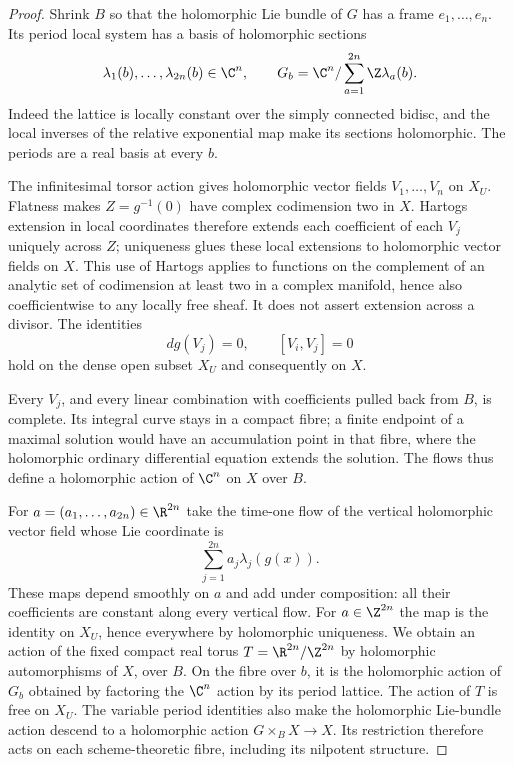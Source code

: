 \begin{proof}
Shrink $B$ so that the holomorphic Lie bundle of $G$ has a
frame $e_1,\ldots,e_n$.  Its period local system has a basis
of holomorphic sections
\[
 \lambda_1(b),\ldots,\lambda_{2n}(b)\in\C^n,
 \qquad
 G_b=\C^n/\sum_{a=1}^{2n}\Z\lambda_a(b).
\]
Indeed the lattice is locally constant over the simply
connected bidisc, and the local inverses of the relative
exponential map make its sections holomorphic.  The periods
are a real basis at every $b$.

The infinitesimal torsor action gives holomorphic vector
fields $V_1,\ldots,V_n$ on $X_U$.  Flatness makes
$Z=g^{-1}(0)$ have complex codimension two in $X$.
Hartogs extension in local coordinates therefore extends
each coefficient of each $V_j$ uniquely across $Z$; uniqueness
glues these local extensions to holomorphic vector fields
on $X$.  This use of Hartogs applies to functions on the
complement of an analytic set of codimension at least two
in a complex manifold, hence also coefficientwise to any
locally free sheaf.  It does not assert extension across a
divisor.  The identities
\[
 dg(V_j)=0,\qquad [V_i,V_j]=0
\]
hold on the dense open subset $X_U$ and consequently on $X$.

Every $V_j$, and every linear combination with coefficients
pulled back from $B$, is complete.  Its integral curve stays
in a compact fibre; a finite endpoint of a maximal solution
would have an accumulation point in that fibre, where the
holomorphic ordinary differential equation extends the
solution.  The flows thus define a holomorphic action of
$\C^n$ on $X$ over $B$.

For $a=(a_1,\ldots,a_{2n})\in\R^{2n}$ take the time-one
flow of the vertical holomorphic vector field whose Lie
coordinate is
\[
 \sum_{j=1}^{2n}a_j\lambda_j(g(x)).
\]
These maps depend smoothly on $a$ and add under composition:
all their coefficients are constant along every vertical
flow.  For $a\in\Z^{2n}$ the map is the identity on $X_U$,
hence everywhere by holomorphic uniqueness.  We obtain an
action of the fixed compact real torus
$T=\R^{2n}/\Z^{2n}$ by holomorphic automorphisms of $X$,
over $B$.  On the fibre over $b$, it is the holomorphic
action of $G_b$ obtained by factoring the $\C^n$ action by
its period lattice.  The action of $T$ is free on $X_U$.
The variable period identities also make the holomorphic
Lie-bundle action descend to a holomorphic action
$G\times_BX\to X$.  Its restriction therefore acts on
each scheme-theoretic fibre, including its nilpotent
structure.


\end{proof}
